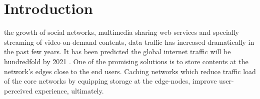 \documentclass[journal,onecolumn]{IEEEtran}
\begin{document}
%
\IEEEpeerreviewmaketitle



\section{Introduction}
% 
% 
% 
% 
 the growth of social networks, multimedia sharing web services and specially streaming of video-on-demand contents, data traffic has increased dramatically in the past few years. It has been predicted the global internet traffic will be hundredfold by 2021 \cite{networking2016forecast}. 
One of the promising solutions is to store contents at the network's edges close to the end users. Caching networks which reduce traffic load of the core networks by equipping storage at the edge-nodes,  improve user-perceived experience, ultimately.  
\end{document}
